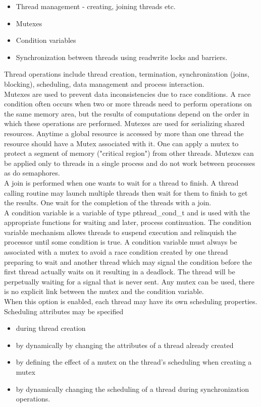 \documentclass[10pt,twocolumn,letterpaper]{article}
\numberwithin{figure}{section}
\begin{document}
\begin{itemize}
\item Thread management - creating, joining threads etc.
\item Mutexes
\item Condition variables
\item Synchronization between threads using read\/write locks and barriers.
\end{itemize}

Thread operations include thread creation, termination, synchronization (joins, blocking), scheduling, data management and process interaction.\\
Mutexes are used to prevent data inconsistencies due to race conditions. A race condition often occurs when two or more threads need to perform operations on the same memory area, but the results of computations depend on the order in which these operations are performed. Mutexes are used for serializing shared resources. Anytime a global resource is accessed by more than one thread the resource should have a Mutex associated with it. One can apply a mutex to protect a segment of memory ("critical region") from other threads. Mutexes can be applied only to threads in a single process and do not work between processes as do semaphores.\\
A join is performed when one wants to wait for a thread to finish. A thread calling routine may launch multiple threads then wait for them to finish to get the results. One wait for the completion of the threads with a join.\\ A condition variable is a variable of type pthread\_cond\_t and is used with the appropriate functions for waiting and later, process continuation. The condition variable mechanism allows threads to suspend execution and relinquish the processor until some condition is true. A condition variable must always be associated with a mutex to avoid a race condition created by one thread preparing to wait and another thread which may signal the condition before the first thread actually waits on it resulting in a deadlock. The thread will be perpetually waiting for a signal that is never sent. Any mutex can be used, there is no explicit link between the mutex and the condition variable. \\

When this option is enabled, each thread may have its own scheduling properties. Scheduling attributes may be specified

\begin{itemize}
\item during thread creation
\item by dynamically by changing the attributes of a thread already created
\item by defining the effect of a mutex on the thread's scheduling when creating a mutex
\item by dynamically changing the scheduling of a thread during synchronization operations.
\end{itemize}
\end{document}
